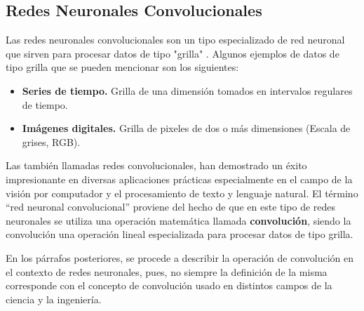    \subsection{Redes Neuronales Convolucionales}
    Las redes neuronales convolucionales son un tipo especializado de red neuronal que 
    sirven para procesar datos de tipo "grilla" \cite{Goodfellow-et-al-2016}. Algunos ejemplos 
    de datos de tipo grilla que se pueden mencionar son los siguientes:
    \begin{itemize}
        \item \textbf{Series de tiempo.} Grilla de una dimensión tomados en intervalos regulares de tiempo.
        \item \textbf{Imágenes digitales.} Grilla de pixeles de dos o más dimensiones (Escala de grises, RGB).
    \end{itemize}

    Las también llamadas redes convolucionales, han demostrado un éxito impresionante en diversas 
    aplicaciones prácticas especialmente en el campo de la visión por computador y el procesamiento de texto y lenguaje natural. 
    El término ``red neuronal convolucional'' proviene del hecho de que en este tipo 
    de redes neuronales se utiliza una operación matemática llamada \textbf{convolución}, siendo la convolución 
    una operación lineal especializada para procesar datos de tipo grilla.

    En los párrafos posteriores, se procede a describir la operación de convolución en el contexto de 
    redes neuronales, pues, no siempre la definición de la misma corresponde con el concepto de convolución
    usado en distintos campos de la ciencia y la ingeniería.

